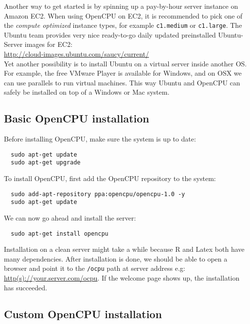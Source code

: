 \documentclass{scrartcl}\usepackage[]{graphicx}\usepackage[]{color}
\begin{document}
\noindent Another way to get started is by spinning up a pay-by-hour server instance on Amazon EC2. When using OpenCPU on EC2, it is recommended to pick one of the \emph{compute optimized} instance types, for example \texttt{c1.medium} or \texttt{c1.large}. The Ubuntu team provides very nice ready-to-go daily updated preinstalled Ubuntu-Server images for EC2:\\

\url{http://cloud-images.ubuntu.com/saucy/current/} \\

\noindent Yet another possibility is to install Ubuntu on a virtual server inside another OS. For example, the free VMware Player is available for Windows, and on OSX we can use parallels to run virtual machines. This way Ubuntu and OpenCPU can safely be installed on top of a Windows or Mac system. \\

\subsection{Basic OpenCPU installation}

Before installing OpenCPU, make sure the system is up to date:

\begin{verbatim}
  sudo apt-get update
  sudo apt-get upgrade
\end{verbatim}
To install OpenCPU, first add the OpenCPU repository to the system:

\begin{verbatim}
  sudo add-apt-repository ppa:opencpu/opencpu-1.0 -y
  sudo apt-get update
\end{verbatim}
We can now go ahead and install the server:

\begin{verbatim}
  sudo apt-get install opencpu
\end{verbatim}
Installation on a clean server might take a while because R and Latex both have many dependencies. After installation is done, we should be able to open a browser and point it to the \texttt{/ocpu} path at server address e.g: \href{http://your.server.com/ocpu}{http(s)://your.server.com/ocpu}. If the welcome page shows up, the installation has succeeded. 

\subsection{Custom OpenCPU installation}
\end{document}
